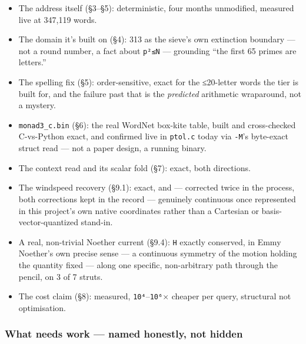 \documentclass[
  10pt,
]{article}
\providecommand{\tightlist}{%
  \setlength{\itemsep}{0pt}\setlength{\parskip}{0pt}}
\begin{document}
\begin{itemize}
\tightlist
\item
  The address itself (§3--§5): deterministic, four months unmodified,
  measured live at 347,119 words.
\item
  The domain it's built on (§4): 313 as the sieve's own extinction
  boundary --- not a round number, a fact about \texttt{p²≤N} ---
  grounding ``the first 65 primes are letters.''
\item
  The spelling fix (§5): order-sensitive, exact for the ≤20-letter words
  the tier is built for, and the failure past that is the
  \emph{predicted} arithmetic wraparound, not a mystery.
\item
  \texttt{monad3\_c.bin} (§6): the real WordNet box-kite table, built
  and cross-checked C-vs-Python exact, and confirmed live in
  \texttt{ptol.c} today via \texttt{-M}'s byte-exact struct read --- not
  a paper design, a running binary.
\item
  The context read and its scalar fold (§7): exact, both directions.
\item
  The windspeed recovery (§9.1): exact, and --- corrected twice in the
  process, both corrections kept in the record --- genuinely continuous
  once represented in this project's own native coordinates rather than
  a Cartesian or basis-vector-quantized stand-in.
\item
  A real, non-trivial Noether current (§9.4): \texttt{H} exactly
  conserved, in Emmy Noether's own precise sense --- a continuous
  symmetry of the motion holding the quantity fixed --- along one
  specific, non-arbitrary path through the pencil, on 3 of 7 struts.
\item
  The cost claim (§8): measured, \texttt{10⁴}--\texttt{10⁶}× cheaper per
  query, structural not optimisation.
\end{itemize}

\hypertarget{what-needs-work-named-honestly-not-hidden}{%
\subsubsection{What needs work --- named honestly, not
hidden}\label{what-needs-work-named-honestly-not-hidden}}
\end{document}
